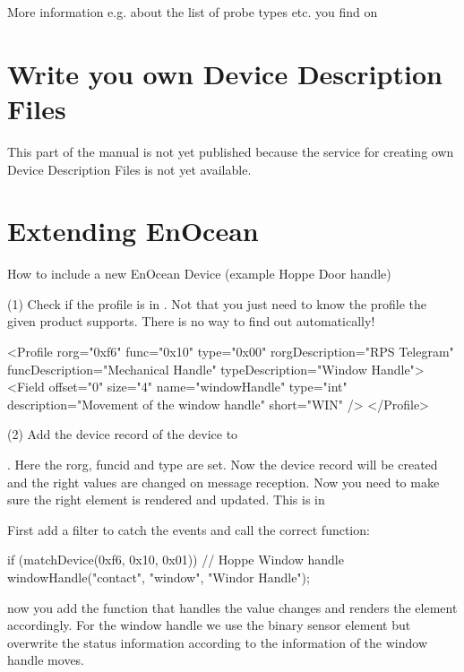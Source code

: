 More information e.g. about the list of probe types etc. you find on 


\section{Write you own Device Description Files}
\label {newddr} 

This part of the manual is not yet published because the service for creating own Device 
Description Files is not yet available.

\section{Extending EnOcean}
\label{addenocean}

How to include a new EnOcean Device (example Hoppe Door handle)

(1) Check if the profile is in . Not that 
you just need to know the profile the given product supports. There is no way 
to find out automatically! 

\begin{listingverbatim}
<Profile rorg="0xf6" func="0x10" type="0x00" rorgDescription="RPS Telegram"
    funcDescription="Mechanical Handle" typeDescription="Window Handle">
  <Field offset="0" size="4" name="windowHandle" type="int" description="Movement of the window handle" short="WIN" />
</Profile>
\end{listingverbatim}

(2) Add the device record of the device to 

{\small
{}. 
}
Here the rorg, funcid and type are set. Now the device record will be created and the 
right values are changed on message reception. Now you need to make sure the right  
element is rendered and updated. This is 
in 

First add a filter to catch the events and call the correct function:

\begin{listingverbatim}
if (matchDevice(0xf6, 0x10, 0x01)) {
  // Hoppe Window handle
  windowHandle("contact", "window", "Windor Handle");
}
\end{listingverbatim}
now you add the function that handles the value changes and renders the element 
accordingly. For the window handle we use the binary sensor element but overwrite 
the status information according to the information of the window handle moves.  

